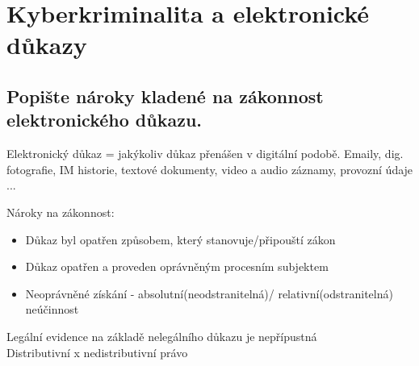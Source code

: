 \section{Kyberkriminalita a elektronické důkazy}

\subsection{Popište nároky kladené na zákonnost elektronického důkazu.}
Elektronický důkaz = jakýkoliv důkaz přenášen v digitální podobě. Emaily, dig. fotografie, IM historie, textové dokumenty, video a audio záznamy, provozní údaje ...

Nároky na zákonnost:\begin{itemize}
    \item Důkaz byl opatřen způsobem, který stanovuje/připouští zákon
    \item Důkaz opatřen a proveden oprávněným procesním subjektem
    \item Neoprávněné získání - absolutní(neodstranitelná)/ relativní(odstranitelná) neúčinnost
\end{itemize}
Legální evidence na základě nelegálního důkazu je nepřípustná\\
Distributivní x nedistributivní právo


